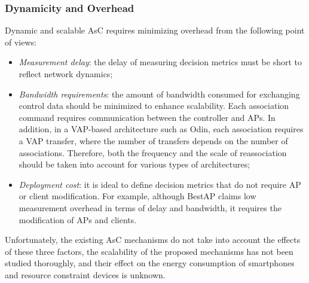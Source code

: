 \subsubsection{\textbf{Dynamicity and Overhead}}
\label{asc_dyn_overhead}
Dynamic and scalable AsC requires minimizing overhead from the following point of views:
\begin{itemize}
\item  \textit{Measurement delay}: the delay of measuring decision metrics must be short to reflect network dynamics;
%
\item  \textit{Bandwidth requirements}: the amount of bandwidth consumed for exchanging control data should be minimized to enhance scalability. 
Each association command requires communication between the controller and APs.
In addition, in a VAP-based architecture such as Odin, each association requires a VAP transfer, where the number of transfers depends on the number of associations.
Therefore, both the frequency and the scale of reassociation should be taken into account for various types of architectures;
%
\item \textit{Deployment cost}: it is ideal to define decision metrics that do not require AP or client modification.
For example, although BestAP  claims low measurement overhead in terms of delay and bandwidth, it requires the modification of APs and clients. 
\end{itemize}

Unfortunately, the existing AsC mechanisms do not take into account the effects of these three factors, the scalability of the proposed mechanisms has not been studied thoroughly, and their effect on the energy consumption of smartphones and resource constraint devices is unknown.


